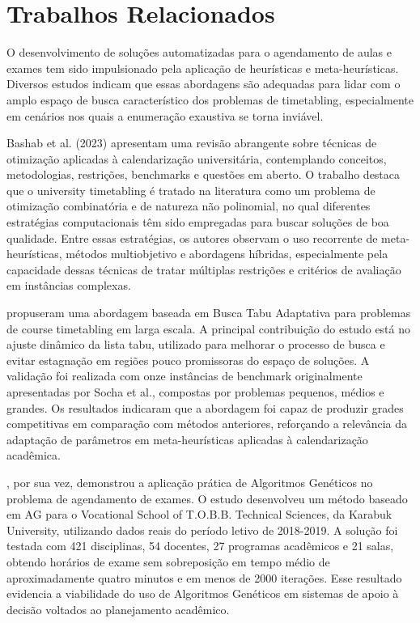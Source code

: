 \section{Trabalhos Relacionados}
\label{sec:trabalhos_correlatos}

O desenvolvimento de soluções automatizadas para o agendamento de aulas e exames tem sido impulsionado pela aplicação de heurísticas e meta-heurísticas. Diversos estudos indicam que essas abordagens são adequadas para lidar com o amplo espaço de busca característico dos problemas de timetabling, especialmente em cenários nos quais a enumeração exaustiva se torna inviável.

Bashab et al. (2023) apresentam uma revisão abrangente sobre técnicas de otimização aplicadas à calendarização universitária, contemplando conceitos, metodologias, restrições, benchmarks e questões em aberto. O trabalho destaca que o university timetabling é tratado na literatura como um problema de otimização combinatória e de natureza não polinomial, no qual diferentes estratégias computacionais têm sido empregadas para buscar soluções de boa qualidade. Entre essas estratégias, os autores observam o uso recorrente de meta-heurísticas, métodos multiobjetivo e abordagens híbridas, especialmente pela capacidade dessas técnicas de tratar múltiplas restrições e critérios de avaliação em instâncias complexas.

 propuseram uma abordagem baseada em Busca Tabu Adaptativa para problemas de course timetabling em larga escala. A principal contribuição do estudo está no ajuste dinâmico da lista tabu, utilizado para melhorar o processo de busca e evitar estagnação em regiões pouco promissoras do espaço de soluções. A validação foi realizada com onze instâncias de benchmark originalmente apresentadas por Socha et al., compostas por problemas pequenos, médios e grandes. Os resultados indicaram que a abordagem foi capaz de produzir grades competitivas em comparação com métodos anteriores, reforçando a relevância da adaptação de parâmetros em meta-heurísticas aplicadas à calendarização acadêmica.

, por sua vez, demonstrou a aplicação prática de Algoritmos Genéticos no problema de agendamento de exames. O estudo desenvolveu um método baseado em AG para o Vocational School of T.O.B.B. Technical Sciences, da Karabuk University, utilizando dados reais do período letivo de 2018-2019. A solução foi testada com 421 disciplinas, 54 docentes, 27 programas acadêmicos e 21 salas, obtendo horários de exame sem sobreposição em tempo médio de aproximadamente quatro minutos e em menos de 2000 iterações. Esse resultado evidencia a viabilidade do uso de Algoritmos Genéticos em sistemas de apoio à decisão voltados ao planejamento acadêmico.

